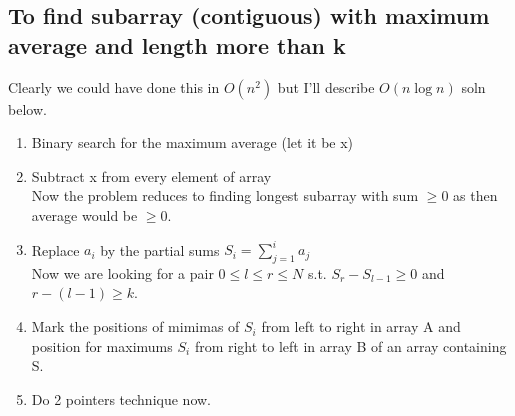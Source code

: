 \documentclass[8pt, a4paper, oneside, twocolumn]{extarticle}
\begin{document}
\subsection{To find subarray (contiguous) with maximum average and length more than \textbf{k}}
Clearly we could have done this in $O(n^2)$ but I'll describe $O(n \log n)$ soln below.
\begin{enumerate}
    \item Binary search for the maximum average (let it be x)
    \item Subtract x from every element of array
\\Now the problem reduces to finding longest subarray with sum $\geq 0$ as then average would be $\geq 0$.
    \item Replace $a_i$ by the partial sums $S_i = \sum_{j = 1}^i a_j$\\
Now we are looking for a pair $0 \leq l \leq r \leq N$ s.t. $S_r - S_{l - 1} \geq 0$ and $r - (l - 1) \geq k$.
    \item Mark the positions of mimimas of $S_i$ from left to right in array A and position for maximums $S_i$ from right to left in array B of an array containing S.
    \item Do 2 pointers technique now.
\end{enumerate}
\end{document}
